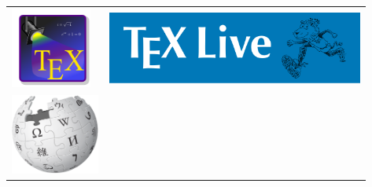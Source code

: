 \begin{tabular}{llll}
\href{http://texstudio.sourceforge.net/}{\includegraphics[height=100px]{img/thanks/texstudio.png}} &
\multicolumn{3}{l}{\href{http://www.tug.org/texlive/}{\includegraphics[height=90px]{img/thanks/texlive.png}}}\\

\href{http://www.wikipedia.org/}{\includegraphics[height=100px]{img/thanks/wikipedia.png}} &
&
&
\\
\end{tabular}

